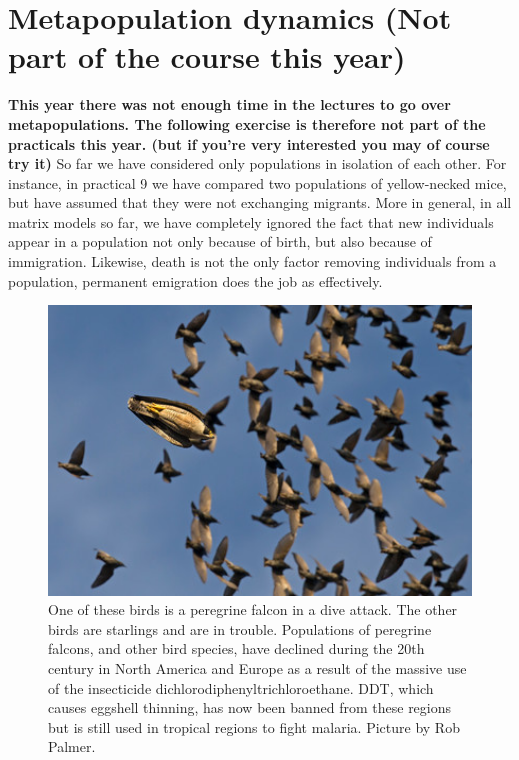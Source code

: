 \documentclass{article}\usepackage[]{graphicx}\usepackage[]{color}
\begin{document}
\section{Metapopulation dynamics (Not part of the course this year)}
\textbf{This year there was not enough time in the lectures to go over metapopulations. The following exercise is therefore not part of the practicals this year. (but if you're very interested you may of course try it)}
So far we have considered only populations in isolation of each other. For instance, in practical 9 we have compared two populations of yellow-necked mice, but have assumed that they were not exchanging migrants. More in general, in all matrix models so far, we have completely ignored the fact that new individuals appear in a population not only because of birth, but also because of immigration. Likewise, death is not the only factor removing individuals from a population, permanent emigration does the job as effectively. 



\begin{figure}
\includegraphics[width=15cm]{peregrine.jpg}
\caption{\label{fig:peregrine}One of these birds is a peregrine falcon in a dive attack. The other birds are starlings and are in trouble. Populations of peregrine falcons, and other bird species, have declined during the 20th century in North America and Europe as a result of the massive use of the insecticide dichlorodiphenyltrichloroethane. DDT, which causes eggshell thinning, has now been banned from these regions but is still used in tropical regions to fight malaria. Picture by Rob Palmer.}
\end{figure}
\end{document}
